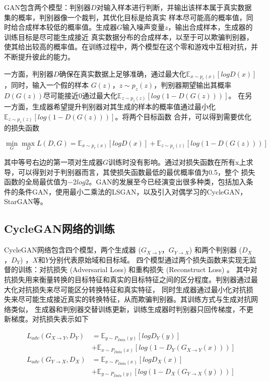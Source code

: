 GAN包含两个模型：判别器$D$对输入样本进行判断，并输出该样本属于真实数据集的概率，判别器像一个裁判，其优化目标是给真实
样本尽可能高的概率值，同时给合成样本较低的概率值。生成器$G$输入噪声变量$z$，输出合成样本，生成器的训练目标是尽可能生成接近
真实数据分布的合成样本，以至于可以欺骗判别器，使其给出较高的概率值。在训练过程中，两个模型在这个零和游戏中互相对抗，并不断提升彼此的能力。

一方面，判别器$D$确保在真实数据上足够准确，通过最大化$\mathbb{E}_{x\sim p_r(x)}\left[log D(x)\right]$，同时，输入一个假的样本
$G(z)$，$z\sim p_z(z)$，判别器期望输出其概率$D(G(z))$尽可能接近$0$通过最大化$\mathbb{E}_{z\sim p_z(z)}\left[log(1-D(G(z)))\right]$。
在另一方面，生成器希望提升判别器对其生成的样本的概率值通过最小化$\mathbb{E}_{z\sim p_z(z)}\left[log(1-D(G(z)))\right]$。将两个目标函数
合并，可以得到需要优化的损失函数

\begin{equation}
    \min_G \max_D L(D,G)=\mathbb{E}_{x\sim p_r(x)}\left[log D(x)\right] + \mathbb{E}_{z\sim p_z(z)}\left[log(1-D(G(z)))\right]
\end{equation}

其中等号右边的第一项对生成器$G$训练时没有影响。通过对损失函数在所有x上求导，可以得到对于判别器而言，其使损失函数最低的最优概率值为0.5，整个
损失函数的全局最优值为$-2log2$。GAN的发展至今已经演变出很多种类，包括加入条件的条件GAN，使用最小二乘法的LSGAN，以及引入对偶学习的CycleGAN，StarGAN等。

\subsection{CycleGAN网络的训练}
CycleGAN网络包含四个模型，两个生成器 ($G_{X\rightarrow Y}$，$G_{Y\rightarrow X}$) 和两个判别器 ($D_X$，$D_Y$) ，$X$和$Y$分别代表原始域和目标域。
四个模型通过两个损失函数来实现无监督的训练：对抗损失 (Adversarial Loss) 和重构损失 (Reconstruct Loss) 。
其中对抗损失用来衡量转换的目标特征和真实的目标特征之间的区分程度。判别器通过最大化对抗损失来尽可能区分转换特征和真实特征，
同时生成器通过最小化对抗损失来尽可能生成接近真实的转换特征，从而欺骗判别器。其训练方式与生成对抗网络类似，
生成器和判别器交替训练更新，训练生成器时判别器只回传梯度，不更新梯度。对抗损失表示如下

\begin{align}
    L_{adv}(G_{X\rightarrow Y},D_Y) & =\mathbb{E}_{y\sim P_{Data}(y)}\left[log D_Y(y)\right] \\
    & + \mathbb{E}_{x\sim P_{Data}(x)}\left[log(1-D_Y(G_{X\rightarrow Y}(x)))\right] \\
    L_{adv}(G_{Y\rightarrow X},D_X) & =\mathbb{E}_{x\sim P_{Data}(x)}\left[log D_X(x)\right] \\
    & + \mathbb{E}_{y\sim P_{Data}(y)}\left[log(1-D_X(G_{Y\rightarrow X}(y)))\right] 
\end{align}


